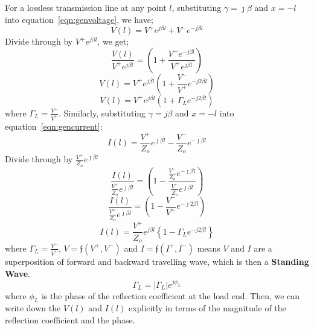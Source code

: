For a lossless transmission line at any point $l$, substituting $\gamma = \jmath\beta$ and $x=-l$ into equation~\ref{eqn:genvoltage}, we have;
\begin{equation*}
V(l) = V^+ e^{j \beta l} + V^- e^{- j \beta l}
\end{equation*}
Divide through by $ V^+ e^{j \beta l}$, we get;
\begin{equation*}
\frac{V(l)}{ V^+ e^{j \beta l}}= \left(1 +\frac{V^- e^{- j \beta l}}{V^+ e^{j \beta l}}\right)
\end{equation*}
\begin{equation*}
V(l) = V^+ e^{j \beta l}\left(1+ \frac{V^-}{V^+}e^{-j 2 \beta l}\right)
\end{equation*}
\begin{equation}
V(l) = V^+ e^{j \beta l}(1 + \Gamma_L e^{-j 2 \beta l})
\label{eqn:voltagefromload2}
\end{equation}
where $\Gamma _L = \frac{V^-}{V^+}$. Similarly, substituting $\gamma = j\beta$ and $x = -l$ into equation~\ref{eqn:gencurrent}:
\begin{equation*}
I(l) = \frac{V^+}{Z_o}  e^{\jmath \beta l} - \frac{V^-}{Z_o} e^{-\jmath\beta l}
\end{equation*}
Divide through by $\frac{V^+}{Z_o}  e^{\jmath\beta l}$
\begin{equation*}
\frac{I(l)}{\frac{V^+}{Z_o}  e^{\jmath\beta l}} = \left( 1- \frac{\frac{V^-}{Z_o} e^{-\jmath\beta l}}{\frac{V^+}{Z_o}  e^{\jmath\beta l}}\right)
\end{equation*}
\begin{equation*}
\frac{I(l)}{\frac{V^+}{Z_o}  e^{\jmath\beta l}} = \left(1-  \frac{V^-}{V^+}e^{-\jmath 2 \beta l}\right)
\end{equation*}
\begin{equation}
I(l) = \frac{V^+}{Z_o}e ^{j \beta l}  \left\{ 1 - \Gamma_L e^{-j 2 \beta l}\right\}
\label{eqn:currentfromload2}
\end{equation}
where \(\Gamma _L = \frac{V^-}{V^+}\), $V = \mathfrak{f}( V^{+}, V^{-})$ and $I = \mathfrak{f}(I^{+}, I^{-})$ means $V$ and $I$ are a superposition of forward and backward travelling wave, which is then a \textbf{Standing Wave}. 
\begin{equation}
\Gamma_L = |\Gamma_L|e^{j\phi_L}
\label{eqn:refcoefficientfromload}
\end{equation}
where $\phi_L$ is the phase of the reflection coefficient at the load end. Then, we can write down the $V(l)$ and $I(l)$ explicitly in terms of the magnitude of the reflection coefficient and the phase.

